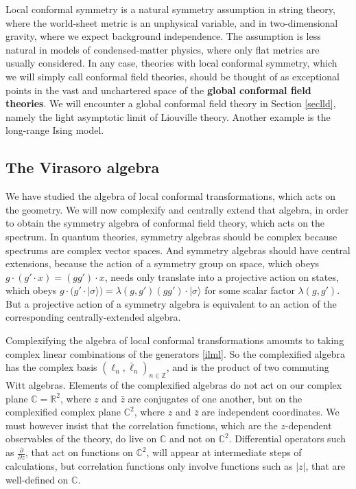 \documentclass[12pt, a4paper, notitlepage, twoside]{report}
\numberwithin{equation}{section}
\theoremstyle{break}
\begin{document}
Local conformal symmetry is a natural symmetry assumption in string theory, where the world-sheet metric is an unphysical variable, and in two-dimensional gravity, where we expect background independence.
The assumption is less natural in models of condensed-matter physics, where only flat metrics are usually considered.
In any case, theories with local conformal symmetry, which we will simply call conformal field theories, should be thought of as exceptional points in the vast and unchartered space of the \textbf{\boldmath global conformal field theories}.
We will encounter a global conformal field theory in Section \ref{seclld}, namely the light asymptotic limit of Liouville theory.
Another example is the long-range Ising model. 


\subsection{The Virasoro algebra \label{secvir}}

We have studied the algebra of local conformal transformations, which acts on the geometry. 
We will now complexify and centrally extend that algebra, in order to obtain the symmetry algebra of conformal field theory, which acts on the spectrum. 
In quantum theories, symmetry algebras should be complex because spectrums are complex vector spaces. And symmetry algebras should have central extensions, because the action of a symmetry group on space, which obeys $g\cdot(g'\cdot x) = (gg')\cdot x$, needs only translate into a projective action on states, which obeys $g\cdot(g'\cdot|\sigma\rangle) = \lambda(g,g') (gg')\cdot |\sigma\rangle$ for some scalar factor $\lambda(g,g')$. 
But a projective action of a symmetry algebra is equivalent to an action of the corresponding centrally-extended algebra. 

Complexifying the algebra of local conformal transformations amounts to taking complex linear combinations of the generators \eqref{ilml}. So the complexified algebra has the complex basis $(\ell_n,\bar\ell_n)_{n\in\mathbb{Z}}$, and is the product of two commuting Witt algebras. Elements of the complexified algebras do not act on our complex plane $\mathbb{C}=\mathbb{R}^2$, where $z$ and $\bar z$ are conjugates of one another, but on the complexified complex plane ${\mathbb{C}}^2$, where $z$ and $\bar z$ are independent coordinates. 
We must however insist that the correlation functions, which are the $z$-dependent observables of the theory, do live on $\mathbb{C}$ and not on ${\mathbb{C}}^2$.
Differential operators such as $\frac{\partial}{\partial z}$, that act on functions on ${\mathbb{C}}^2$, will appear at intermediate steps of calculations, but correlation functions only involve functions such as $|z|$, that are well-defined on $\mathbb{C}$. 
\end{document}

